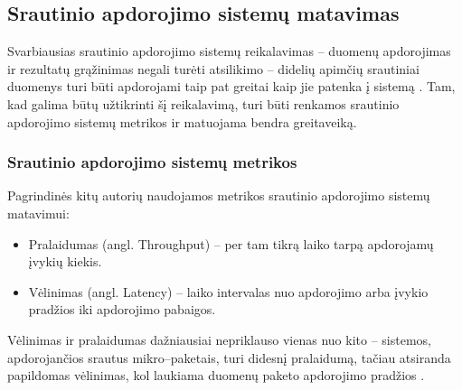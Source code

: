 \documentclass{VUMIFPSbakalaurinis}
\begin{document}
\subsection{Srautinio apdorojimo sistemų matavimas}
Svarbiausias srautinio apdorojimo sistemų reikalavimas – duomenų apdorojimas ir rezultatų grąžinimas negali turėti atsilikimo – didelių apimčių srautiniai duomenys turi būti apdorojami taip pat greitai kaip jie patenka į sistemą \cite{stonebraker20058}. Tam, kad galima būtų užtikrinti šį reikalavimą, turi būti renkamos srautinio apdorojimo sistemų metrikos ir matuojama bendra greitaveiką.

\subsubsection{Srautinio apdorojimo sistemų metrikos}
Pagrindinės kitų autorių naudojamos metrikos srautinio apdorojimo sistemų matavimui:
\begin{itemize}
    \item Pralaidumas (angl. Throughput) – per tam tikrą laiko tarpą apdorojamų įvykių kiekis.
    \item Vėlinimas (angl. Latency) – laiko intervalas nuo apdorojimo arba įvykio pradžios iki apdorojimo pabaigos.
\end{itemize}
Vėlinimas ir pralaidumas dažniausiai nepriklauso vienas nuo kito – sistemos, apdorojančios srautus mikro–paketais, turi didesnį pralaidumą, tačiau atsiranda papildomas vėlinimas, kol laukiama duomenų paketo apdorojimo pradžios \cite{Karimov2018BenchmarkingDS}. \par
\end{document}
